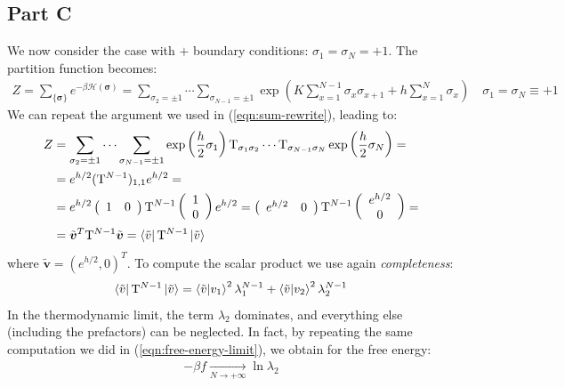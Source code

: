 \documentclass[12pt,a4paper]{report}
\begin{document}
\subsection{Part C}
We now consider the case with $+$ boundary conditions: $\sigma_1 = \sigma_N = +1$. The partition function becomes:
\begin{align*}
    Z = \sum_{\{\bm{\sigma}\}} e^{-\beta \mathcal{H}(\bm{\sigma})} = \sum_{\sigma_{2} = \pm 1} \cdots \sum_{\sigma_{N-1} = \pm 1} \exp\left(K \sum_{x=1}^{N-1} \sigma_x \sigma_{x+1} + h \sum_{x=1}^N \sigma_x\right) \quad \sigma_1=\sigma_N \equiv +1
\end{align*}
We can repeat the argument we used in (\ref{eqn:sum-rewrite}), leading to:
\begin{align*}
    Z &= \sum_{\sigma_2 = \pm 1} \cdots \sum_{\sigma_{N-1} = \pm 1} \exp\left(\frac{h}{2}\sigma_1 \right) \mathrm{T}_{\sigma_1 \sigma_2} \cdots \mathrm{T}_{\sigma_{N-1} \sigma_N} \exp\left(\frac{h}{2} \sigma_N \right) =\\
    &= e^{h/2} (\mathrm{T}^{N-1})_{1,1} e^{h/2} =\\
    &= e^{h/2} \left(\begin{array}{cc}
    1 & 0
    \end{array}\right) \mathrm{T}^{N-1} \left(\begin{array}{c}
    1 \\ 
    0
    \end{array}\right) e^{h/2} = \left(\begin{array}{cc}
    e^{h/2} & 0
    \end{array}\right) \mathrm{T}^{N-1} \left(\begin{array}{c}
    e^{h/2} \\ 
    0
    \end{array}\right) =\\
    &= \tilde{\bm{v}}^T \mathrm{T}^{N-1} \tilde{\bm{v}} = \bra{\tilde{v}} \mathrm{T}^{N-1} \ket{\tilde{v}}
\end{align*}
where $\tilde{\bm{v}} = (e^{h/2},0)^T$. To compute the scalar product we use again \textit{completeness}:
\begin{align*}
    \bra{\tilde{v}} \mathrm{T}^{N-1} \ket{\tilde{v}} = \braket{\tilde{v}}{v_1}^2 \lambda_1^{N-1} + \braket{\tilde{v}}{v_2}^2 \lambda_2^{N-1}
\end{align*} 
In the thermodynamic limit, the term $\lambda_2$ dominates, and everything else (including the prefactors) can be neglected. In fact, by repeating the same computation we did in (\ref{eqn:free-energy-limit}), we obtain for the free energy:
\begin{align*}
    - \beta f  \xrightarrow[N \to +\infty]{}    \ln \lambda_2
\end{align*}
\end{document}
